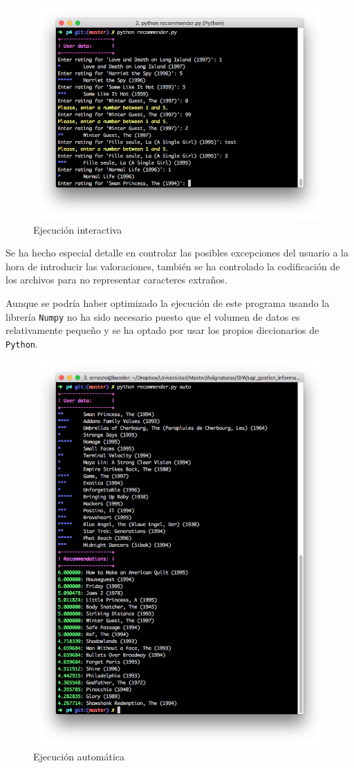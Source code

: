 \begin{figure}
\centering
\includegraphics[width=1.1\textwidth]{../images/interactive.png}
\caption{Ejecución interactiva}
\end{figure}

\bigskip
Se ha hecho especial detalle en controlar las posibles excepciones del usuario a la hora de introducir las valoraciones, también se ha controlado la codificación de los archivos para no representar caracteres extraños.

\bigskip
Aunque se podría haber optimizado la ejecución de este programa usando la librería \texttt{Numpy} no ha sido necesario puesto que el volumen de datos es relativamente pequeño y se ha optado por usar los propios diccionarios de \texttt{Python}.

\begin{figure}
\centering
\includegraphics[width=1.0\textwidth]{../images/automatic.png}
\caption{Ejecución automática}
\end{figure}
